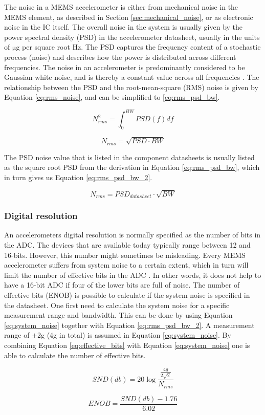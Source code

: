 The noise in a MEMS accelerometer is either from mechanical noise in the MEMS element, as described in Section \ref{sec:mechanical_noise}, or as electronic noise in the IC itself. The overall noise in the system is usually given by the power spectral density (PSD) in the accelerometer datasheet, usually in the units of $\si{\micro}$g per square root Hz. The PSD captures the frequency content of a stochastic process (noise) and describes how the power is distributed across different frequencies. The noise in an accelerometer is predominantly considered to be Gaussian white noise, and is thereby a constant value across all frequencies \cite{freescale_accel_guide}. The relationship between the PSD and the root-mean-square (RMS) noise is given by Equation \ref{eq:rms_noise}, and can be simplified to \ref{eq:rms_psd_bw}.

\begin{equation}
N^{2}_{rms}=\int_0^{BW}{PSD(f)df}
\label{eq:rms_noise}
\end{equation}

\begin{equation}
N_{rms}=\sqrt{PSD \cdot BW}
\label{eq:rms_psd_bw}
\end{equation}

The PSD noise value that is listed in the component datasheets is usually listed as the square root PSD from the derivation in Equation \ref{eq:rms_psd_bw}, which in turn gives us Equation \ref{eq:rms_psd_bw_2}.

\begin{equation}
N_{rms}=PSD_{datasheet} \cdot \sqrt{BW}
\label{eq:rms_psd_bw_2}
\end{equation}

\subsubsection{Digital resolution}

An accelerometers digital resolution is normally specified as the number of bits in the ADC. The devices that are available today typically range between 12 and 16-bits. However, this number might sometimes be misleading. Every MEMS accelerometer suffers from system noise to a certain extent, which in turn will limit the number of effective bits in the ADC \cite[~p.3]{freescale_accel_terminology}. In other words, it does not help to have a 16-bit ADC if four of the lower bits are full of noise. The number of effective bits (ENOB) is possible to calculate if the system noise is specified in the datasheet. One first need to calculate the system noise for a specific measurement range and bandwidth. This can be done by using Equation \ref{eq:system_noise} together with Equation \ref{eq:rms_psd_bw_2}. A measurement range of $\pm$2g (4g in total) is assumed in Equation \ref{eq:system_noise}. By combining Equation \ref{eq:effective_bits} with Equation \ref{eq:system_noise} one is able to calculate the number of effective bits. 

\begin{equation}
SND(db) = 20\log{\frac{\frac{4g}{2\sqrt{2}}}{N_{rms}}}
\label{eq:system_noise}
\end{equation}

\begin{equation}
ENOB = \frac{SND(db)-1.76}{6.02}
\label{eq:effective_bits}
\end{equation}